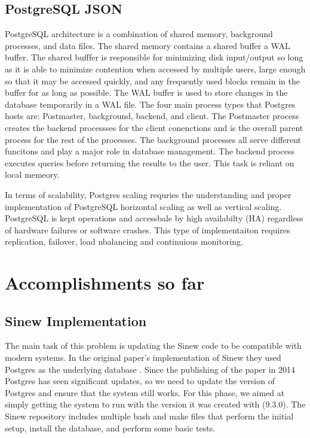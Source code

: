 \documentclass[sigconf]{acmart}
\begin{document}
        \subsection{PostgreSQL JSON}
     PostgreSQL architecture \cite{PostgresMedium} is a combination of shared memory, background processes, and data files. The shared memory contains a shared buffer a WAL buffer. The shared bufffer is responsible for minimizing disk input/output so long as it is able to minimize contention when accessed by multiple users, large enough so that it may be accessed quickly, and any frequently used blocks remain in the buffer for as long as possible. The WAL buffer is used to store changes in the database temporarily in a WAL file. The four main process types that Postgres hosts are: Postmaster, background, backend, and client. The Postmaster process creates the backend processses for the client conenctions and is the overall parent process for the rest of the processes. The background processes all serve different funcitons and play a major role in database management. The backend process executes queries before returning the results to the user. This task is reliant on local memeory. 

     In terms of scalability, Postgres scaling\cite{Postgres-scalable} requries the understanding and proper implementation of PostgreSQL horizontal scaling as well as vertical scaling. PostgreSQL is kept operations and accessbale by high availabilty (HA) regardless of hardware failures or software crashes. This type of implementaiton requires replication, failover, load nbalancing and continuious monitoring. 

\section{Accomplishments so far}
    \subsection{Sinew Implementation}
    The main task of this problem is updating the Sinew code to be compatible with modern systems. In the original paper's implementation of Sinew they used Postgres as the underlying database \cite{Tahara_Diamond_Abadi_2014}. Since the publishing of the paper in 2014 Postgres has seen significant updates, so we need to update the version of Postgres and ensure that the system still works. For this phase, we aimed at simply getting the system to run with the version it was created with (9.3.0). The Sinew repository includes multiple bash and make files that perform the initial setup, install the database, and perform some basic tests.
\end{document}
